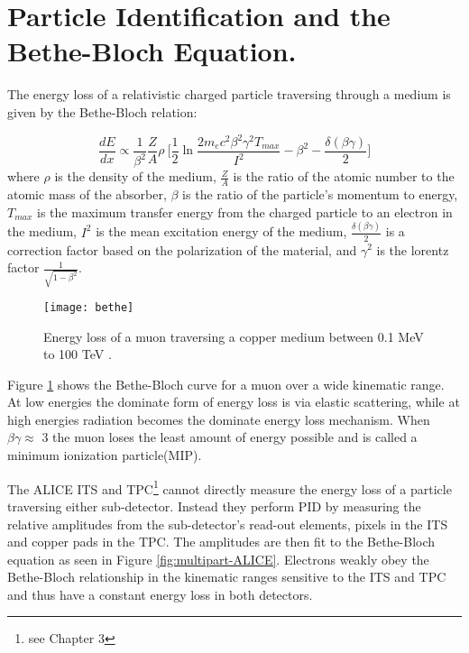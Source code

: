 \section{Particle Identification and the Bethe-Bloch Equation.}\label{ref:pid}


The energy loss of a relativistic charged particle traversing through a medium is given by the Bethe-Bloch relation:

\begin{equation}
\frac{dE}{dx} \propto \frac{1}{\beta^{2}} \frac{Z}{A} \rho \  \bigg[ \frac{1}{2} \ln \frac{2 m_{e} c^{2} \beta^{2} \gamma^{2} T_{max}}{I^{2}} - \beta^{2} - \frac{\delta \left( \beta \gamma \right) }{2} \bigg]
\end{equation}
\noindent
where $\rho$ is the density of the medium, $\frac{Z}{A}$ is the ratio of the atomic number to the atomic mass of the absorber, $\beta$ is the ratio of the particle's momentum to energy, $T_{max}$ is the maximum transfer energy from the charged particle to an electron in the medium,  $I^{2}$ is the mean excitation energy of the medium, $\frac{\delta \left( \beta \gamma \right) }{2}$ is a correction factor based on the polarization of the material, and $\gamma^{2}$ is the lorentz factor $\frac{1}{\sqrt{1-\beta^{2}}}$.

\begin{figure}[h]
\texttt{[image: bethe]}
\centering
\caption{ Energy loss of a muon traversing a copper medium between 0.1 MeV to 100 TeV \cite{Patrignani:2016xqp}.}
\label{fig:rawBB}
\end{figure}

Figure \ref{fig:rawBB} shows the Bethe-Bloch curve for a muon over a wide kinematic range.  At low energies the dominate form of energy loss is via elastic scattering, while at high energies radiation becomes the dominate energy loss mechanism. When $\beta \gamma \approx$ 3 the muon loses the least amount of energy possible and is called a minimum ionization particle(MIP).  

The ALICE ITS and TPC\footnote{see Chapter 3} cannot directly measure the energy loss of a particle traversing either sub-detector.  Instead they perform PID by measuring the relative amplitudes from the sub-detector's read-out elements, pixels in the ITS and copper pads in the TPC.  The amplitudes are then fit to the Bethe-Bloch equation as seen in Figure \ref{fig:multipart-ALICE}.  Electrons weakly obey the Bethe-Bloch relationship in the kinematic ranges sensitive to the ITS and TPC and thus have a constant energy loss in both detectors.

